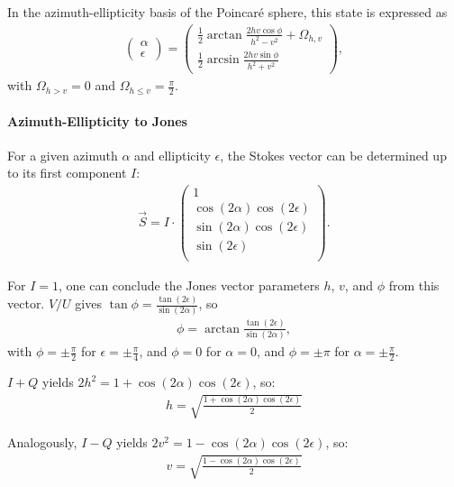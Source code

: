 In the azimuth-ellipticity basis of the Poincaré sphere, this state is expressed as
\begin{align}
    \begin{pmatrix}\alpha \\ \epsilon \end{pmatrix} =
    \begin{pmatrix}
        \frac{1}{2} \arctan \frac{2hv \cos \phi}{h^2 - v^2} + \Omega_{h, v}\\
        \frac{1}{2} \arcsin \frac{2hv\sin\phi}{h^2 + v^2}
    \end{pmatrix}
    ,
\end{align}
with $\Omega_{h > v} = 0$ and $\Omega_{h \leq v} = \frac{\pi}{2}$.

\paragraph*{Azimuth-Ellipticity to Jones}
For a given azimuth $\alpha$ and ellipticity $\epsilon$, the Stokes vector can be determined up to its first component $I$:
\begin{align}
    \vec S = I \cdot 
    \begin{pmatrix}
        1 \\
        \cos (2\alpha) \cos(2\epsilon) \\
        \sin (2\alpha) \cos(2\epsilon) \\
        \sin(2\epsilon) \\
    \end{pmatrix}.
\end{align}

For $I = 1$, one can conclude the Jones vector parameters $h$, $v$, and $\phi$ from this vector.
$V / U$ gives $\tan \phi = \frac{\tan(2\epsilon)}{\sin(2\alpha)}$, so
\begin{align}
    \phi = \arctan \frac{\tan(2\epsilon)}{\sin(2\alpha)},
\end{align}
with $\phi = \pm \frac{\pi}{2}$ for $\epsilon = \pm \frac{\pi}{4}$, and $\phi = 0$ for $\alpha  = 0$, and $\phi = \pm\pi$ for $\alpha = \pm\frac{\pi}{2}$.

$I + Q$ yields $ 2 h^2 = 1 + \cos(2\alpha) \cos(2\epsilon)$, so:
\begin{align}
    h = \sqrt{\frac{1 + \cos(2\alpha) \cos(2\epsilon)}{2}}
\end{align}

Analogously, $I - Q$ yields $ 2 v^2 = 1 - \cos(2\alpha) \cos(2\epsilon)$, so:
\begin{align}
    v = \sqrt{\frac{1 - \cos(2\alpha) \cos(2\epsilon)}{2}}
\end{align}


